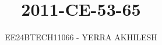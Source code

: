 \documentclass[journal]{IEEEtran}
\begin{document}

\vspace{3cm}

\title{2011-CE-53-65}
\author{EE24BTECH11066 - YERRA AKHILESH
}
{\let\newpage\relax\maketitle}

\renewcommand{\thefigure}{\theenumi}
\renewcommand{\thetable}{\theenumi}
\setlength{\intextsep}{10pt} %


\renewcommand{\thetable}{\theenumi}
\end{document}
